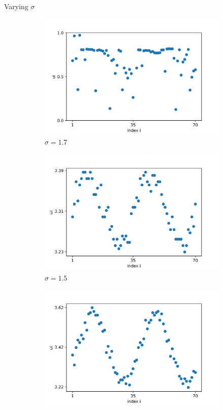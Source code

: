 \documentclass{beamer}
\begin{document}
\begin{frame}{Varying $\sigma$}
\begin{figure}[H]
\begin{subfigure}{.32\textwidth}
  \includegraphics[width=1\linewidth]{u_sigma=1.7.png}  
  \caption{$\sigma = 1.7$}
\end{subfigure}
\begin{subfigure}{.32\textwidth}
  \centering
  \includegraphics[width=1\linewidth]{w_sigma=1.5.png}  
  \caption{$\sigma = 1.5$}
\end{subfigure}
\hfill
\begin{subfigure}{.32\textwidth}
  \centering
  \includegraphics[width=1\linewidth]{w_sigma=1.6.png}  

\end{subfigure}
\end{figure}
\end{frame}
\end{document}
